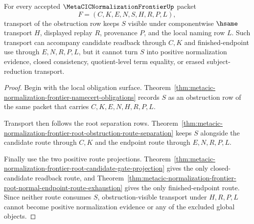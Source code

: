 \begin{theorem}
\label{thm:metacic-normalization-frontier-obstruction-visible-transport}
For every accepted $\MetaCICNormalizationFrontierUp$ packet
$$
F=(C,K,E,N,S,H,R,P,L),
$$
transport of the obstruction row keeps $S$ visible under componentwise $\hsame$ transport $H$, displayed replay $R$, provenance $P$, and the local naming row $L$. Such transport can accompany candidate readback through $C,K$ and finished-endpoint use through $E,N,R,P,L$, but it cannot turn $S$ into positive normalization evidence, closed consistency, quotient-level term equality, or erased subject-reduction transport.
\end{theorem}
\begin{proof}
Begin with the local obligation surface. Theorem~\ref{thm:metacic-normalization-frontier-namecert-obligations} records $S$ as an obstruction row of the same packet that carries $C,K,E,N,H,R,P,L$.

Transport then follows the root separation rows. Theorem~\ref{thm:metacic-normalization-frontier-root-obstruction-route-separation} keeps $S$ alongside the candidate route through $C,K$ and the endpoint route through $E,N,R,P,L$.

Finally use the two positive route projections. Theorem~\ref{thm:metacic-normalization-frontier-root-candidate-gate-projection} gives the only closed-candidate readback route, and Theorem~\ref{thm:metacic-normalization-frontier-root-normal-endpoint-route-exhaustion} gives the only finished-endpoint route. Since neither route consumes $S$, obstruction-visible transport under $H,R,P,L$ cannot become positive normalization evidence or any of the excluded global objects.
\end{proof}

